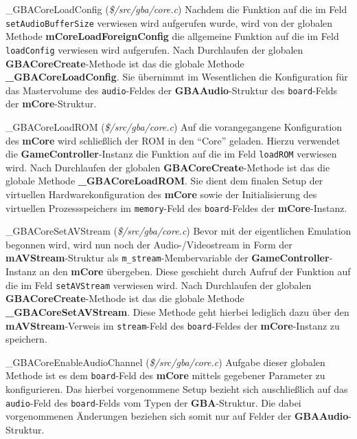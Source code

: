 \documentclass[11pt,a4paper]{scrartcl}
\begin{document}
\vspace{5mm}
\large {\_}GBACoreLoadConfig \normalsize(\textit{\$/src/gba/core.c})
\vspace{2mm}\newline
Nachdem die Funktion auf die im Feld \verb|setAudioBufferSize| verwiesen wird aufgerufen wurde, wird von der globalen Methode \textbf{mCoreLoadForeignConfig} die allgemeine Funktion auf die im Feld \verb|loadConfig| verwiesen wird aufgerufen. Nach Durchlaufen der globalen \textbf{GBACoreCreate}-Methode ist das die globale Methode \textbf{{\_}GBACoreLoadConfig}. Sie \"ubernimmt im Wesentlichen die Konfiguration f\"ur das Mastervolume des \verb|audio|-Feldes der \textbf{GBAAudio}-Struktur des \verb|board|-Felds der \textbf{mCore}-Struktur.

\newpage

\vspace{5mm}
\large {\_}GBACoreLoadROM \normalsize(\textit{\$/src/gba/core.c})
\vspace{2mm}\newline
Auf die vorangegangene Konfiguration des \textbf{mCore} wird schlie{\ss}lich der ROM in den \enquote{Core} geladen. Hierzu verwendet die \textbf{GameController}-Instanz die Funktion auf die im Feld \verb|loadROM| verwiesen wird. Nach Durchlaufen der globalen \textbf{GBACoreCreate}-Methode ist das die globale Methode \textbf{{\_}GBACoreLoadROM}. Sie dient dem finalen Setup der virtuellen Hardwarekonfiguration des \textbf{mCore} sowie der Initialisierung des virtuellen Prozessspeichers im \verb|memory|-Feld des \verb|board|-Feldes der \textbf{mCore}-Instanz.

\vspace{5mm}
\large {\_}GBACoreSetAVStream \normalsize(\textit{\$/src/gba/core.c})
\vspace{2mm}\newline
Bevor mit der eigentlichen Emulation begonnen wird, wird nun noch der Audio-/Videostream in Form der \textbf{mAVStream}-Struktur als \verb|m_stream|-Membervariable der \textbf{GameController}-Instanz an den \textbf{mCore} \"ubergeben. Diese geschieht durch Aufruf der Funktion auf die im Feld \verb|setAVStream| verwiesen wird. Nach Durchlaufen der globalen \textbf{GBACoreCreate}-Methode ist das die globale Methode \textbf{{\_}GBACoreSetAVStream}. Diese Methode geht hierbei lediglich dazu \"uber den \textbf{mAVStream}-Verweis im \verb|stream|-Feld des \verb|board|-Feldes der \textbf{mCore}-Instanz zu speichern.

\vspace{5mm}
\large {\_}GBACoreEnableAudioChannel \normalsize(\textit{\$/src/gba/core.c})
\vspace{2mm}\newline
Aufgabe dieser globalen Methode ist es dem \verb|board|-Feld des \textbf{mCore} mittels gegebener Parameter zu konfigurieren. Das hierbei vorgenommene Setup bezieht sich auschlie{\ss}lich auf das \verb|audio|-Feld des \verb|board|-Felds vom Typen der \textbf{GBA}-Struktur. Die dabei vorgenommenen \"Anderungen beziehen sich somit nur auf Felder der \textbf{GBAAudio}-Struktur.
\end{document}
